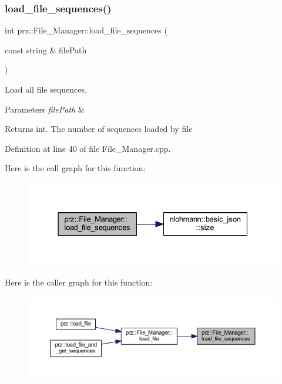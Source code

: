 \subsubsection{\texorpdfstring{load\_file\_sequences()}{load\_file\_sequences()}}
{\footnotesize\ttfamily int prz\+::\+File\+\_\+\+Manager\+::load\+\_\+file\+\_\+sequences (\begin{DoxyParamCaption}\item[{const string \&}]{file\+Path }\end{DoxyParamCaption})}



Load all file sequences. 


\begin{DoxyParams}{Parameters}
{\em file\+Path} & \\
\hline
\end{DoxyParams}
\begin{DoxyReturn}{Returns}
int. The number of sequences loaded by file 
\end{DoxyReturn}


Definition at line 40 of file File\+\_\+\+Manager.\+cpp.

Here is the call graph for this function\+:
\nopagebreak
\begin{figure}[H]
\begin{center}
\leavevmode
\includegraphics[width=331pt]{classprz_1_1_file___manager_a930093b7f609e4f9cf755efb0d91ef46_cgraph}
\end{center}
\end{figure}
Here is the caller graph for this function\+:
\nopagebreak
\begin{figure}[H]
\begin{center}
\leavevmode
\includegraphics[width=350pt]{classprz_1_1_file___manager_a930093b7f609e4f9cf755efb0d91ef46_icgraph}
\end{center}
\end{figure}


